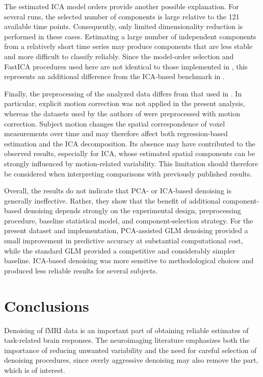 \documentclass[english]{pwr_wmat_praca_dyplomowa}
\theoremstyle{definition}
\theoremstyle{remark}
\begin{document}
\newpage
The estimated ICA model orders provide another possible explanation. For several runs, the selected number of components is large relative to the 121 available time points. Consequently, only limited dimensionality reduction is performed in these cases. Estimating a large number of independent components from a relatively short time series may produce components that are less stable and more difficult to classify reliably. Since the model-order selection and FastICA procedures used here are not identical to those implemented in \cite{glm-denoise}, this represents an additional difference from the ICA-based benchmark in \cite{glm-denoise}.

Finally, the preprocessing of the analyzed data differs from that used in \cite{glm-denoise}. In particular, explicit motion correction was not applied in the present analysis, whereas the datasets used by the authors of \cite{glm-denoise} were preprocessed with motion correction. Subject motion changes the spatial correspondence of voxel measurements over time and may therefore affect both regression-based estimation and the ICA decomposition. Its absence may have contributed to the observed results, especially for ICA, whose estimated spatial components can be strongly influenced by motion-related variability. This limitation should therefore be considered when interpreting comparisons with previously published results.

Overall, the results do not indicate that PCA- or ICA-based denoising is generally ineffective. Rather, they show that the benefit of additional component-based denoising depends strongly on the experimental design, preprocessing procedure, baseline statistical model, and component-selection strategy. For the present dataset and implementation, PCA-assisted GLM denoising provided a small improvement in predictive accuracy at substantial computational cost, while the standard GLM provided a competitive and considerably simpler baseline. ICA-based denoising was more sensitive to methodological choices and produced less reliable results for several subjects.

\chapter{Conclusions}
\label{chapter:conclusions}

Denoising of fMRI data is an important part of obtaining reliable estimates of task-related brain responses. The neuroimaging literature emphasizes both the importance of reducing unwanted variability and the need for careful selection of denoising procedures, since overly aggressive denoising may also remove the part, which is of interest.
\end{document}
